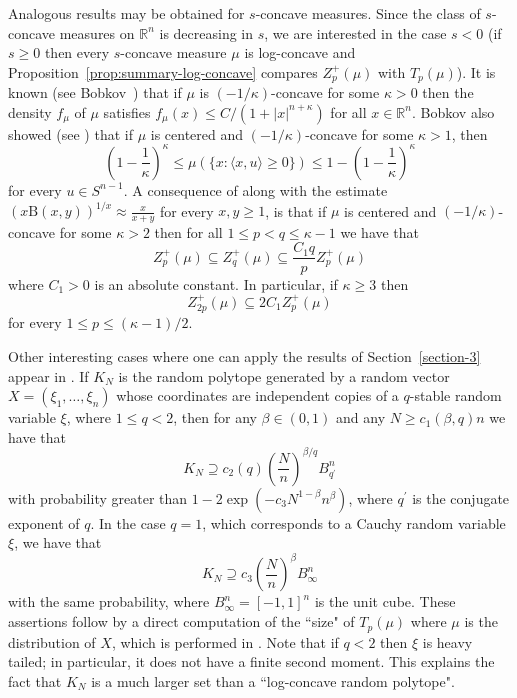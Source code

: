 \documentclass[11pt,leqno]{article}
\theoremstyle{definition}
\theoremstyle{remark}
\numberwithin{equation}{section}
\newcommand{\ls}{\leqslant}
\newcommand{\gr}{\geqslant}
\newcommand{\1}{\textbf{1}}
\begin{document}
Analogous results may be obtained for $s$-concave measures. Since the class of $s$-concave
measures on $\mathbb{R}^n$ is decreasing in $s$, we are interested in the case $s<0$ (if $s\gr 0$
then every $s$-concave measure $\mu$ is log-concave and Proposition~\ref{prop:summary-log-concave}
compares $Z_p^+(\mu)$ with $T_p(\mu)$). It is known (see Bobkov~\cite{Bobkov-2007}) that if $\mu$ is $(-1/\kappa)$-concave
for some $\kappa>0$ then the density $f_{\mu}$ of $\mu$ satisfies $f_{\mu}(x)\ls C/(1+|x|^{n+\kappa})$
for all $x\in\mathbb{R}^n$. Bobkov also showed (see \cite[Theorem~5.2]{Bobkov-2010}) that if $\mu$ is centered and $(-1/\kappa)$-concave for some $\kappa>1$, then
\begin{equation}\label{eq:s-concave} \left(1-\frac{1}{\kappa}\right)^{\kappa} \ls \mu(\{x:\langle x,u\rangle \gr 0\}) \ls 1-\left(1-\frac{1}{\kappa}\right)^{\kappa}\end{equation}
for every $u \in S^{n-1}$.
A consequence of \cite[Corollary~8]{Fradelizi-Guedon-Pajor-2014} along with the estimate $\left(x\mathrm{B}(x,y)\right)^{1/x} \approx \frac{x}{x+y}$ for every $x,y \gr 1$, is that if
$\mu$ is centered and $(-1/\kappa)$-concave for some $\kappa >2$ then for all $1\ls p<q\ls \kappa-1$ we have that
\begin{equation}\label{eq:k-Zp-star}Z_p^+(\mu)\subseteq Z_q^+(\mu)\subseteq \frac{C_1q}{p}Z_p^+(\mu)\end{equation}
where $C_1>0$ is an absolute constant. In particular, if $\kappa \gr 3$ then
\begin{equation}\label{eq:k-Zp-star-2} Z_{2p}^+(\mu) \subseteq 2C_1 Z_{p}^+(\mu)
\end{equation}
for every $1 \ls p \ls (\kappa-1)/2$.


Other interesting cases where one can apply the results of Section~\ref{section-3} appear in \cite{GKKMR-2022}.
If $K_N$ is the random polytope generated by a random vector $X=(\xi_1,\ldots ,\xi_n)$ whose
coordinates are independent copies of a $q$-stable random variable $\xi$, where $1\ls q<2$, then
for any $\beta\in (0,1)$ and any $N\gr c_1(\beta,q)n$ we have that
$$K_N\supseteq c_2(q)\left(\frac{N}{n}\right)^{\beta/q}B_{q^{\prime}}^n$$
with probability greater than $1-2\exp(-c_3N^{1-\beta}n^{\beta})$, where $q^{\prime}$ is the conjugate
exponent of $q$. In the case $q=1$, which corresponds to a Cauchy random variable $\xi$, we have that
$$K_N\supseteq c_3\left(\frac{N}{n}\right)^{\beta}B_{\infty}^n$$
with the same probability, where $B_{\infty}^n=[-1,1]^n$ is the unit cube.
These assertions follow by a direct computation of the ``size" of $T_p(\mu)$ where $\mu$ is
the distribution of $X$, which is performed in \cite{GKKMR-2022}. Note that if $q<2$ then $\xi$ is heavy tailed; in particular, it
does not have a finite second moment. This explains the fact that $K_N$ is a much larger set than
a ``log-concave random polytope".
\end{document}
